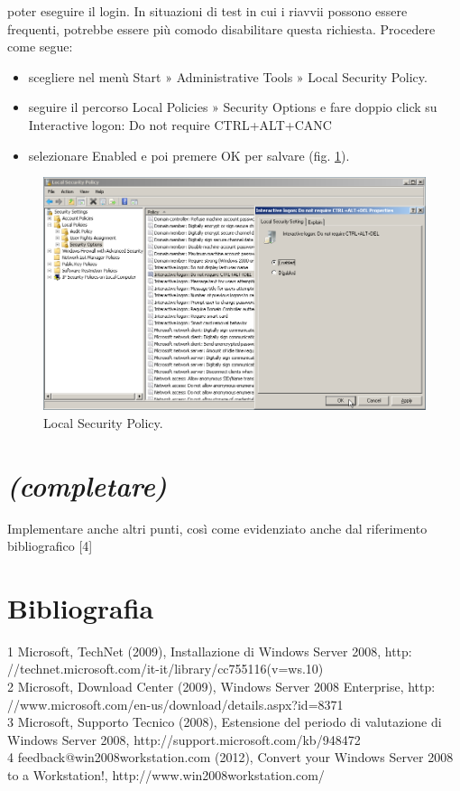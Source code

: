 poter eseguire il login. In situazioni di test in cui i riavvii possono essere frequenti,
potrebbe essere più comodo disabilitare questa richiesta. Procedere
come segue:

\begin{itemize}
    \item scegliere nel menù Start » Administrative Tools » Local Security Policy.
    \item seguire il percorso Local Policies » Security Options e fare doppio click
su Interactive logon: Do not require CTRL+ALT+CANC
    \item selezionare Enabled e poi premere OK per salvare (fig. \ref{fig:grab0025}).
\end{itemize}

\begin{figure}[htbp]
 \centering
 \includegraphics[scale=0.5]{images/grab0025}
 \caption{Local Security Policy.}
\label{fig:grab0025}
\end{figure}

\section{\itshape (completare)}
Implementare anche altri punti, così come evidenziato anche dal riferimento
bibliografico [4]

\section {Bibliografia}
1 Microsoft, TechNet (2009), Installazione di Windows Server 2008, http:
//technet.microsoft.com/it-it/library/cc755116(v=ws.10) \\
2 Microsoft, Download Center (2009), Windows Server 2008 Enterprise, http:
//www.microsoft.com/en-us/download/details.aspx?id=8371 \\
3 Microsoft, Supporto Tecnico (2008), Estensione del periodo di valutazione di
Windows Server 2008, http://support.microsoft.com/kb/948472 \\
4 feedback@win2008workstation.com (2012), Convert your Windows Server
2008 to a Workstation!, http://www.win2008workstation.com/
